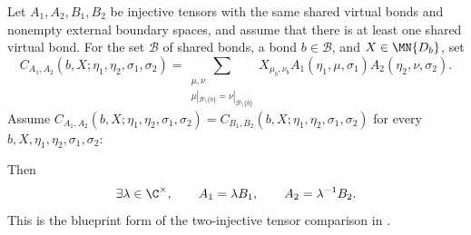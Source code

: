 \begin{theorem}%
    \label{thm:peps_twoInjectiveTensorInsertionComparison}
    \leanok
    Let $A_1,A_2,B_1,B_2$ be injective tensors with the same shared virtual
    bonds and nonempty external boundary spaces, and assume that there is at
    least one shared virtual bond. For the set $\mathcal B$ of shared bonds, a
    bond $b\in\mathcal B$, and $X\in\MN{D_b}$, set
    \[
        C_{A_1,A_2}(b,X;\eta_1,\eta_2,\sigma_1,\sigma_2)
        =
        \sum_{\substack{\mu,\nu\\
        \mu|_{\mathcal B\setminus\{b\}}
        =\nu|_{\mathcal B\setminus\{b\}}}}
        X_{\mu_b,\nu_b}
        A_1(\eta_1,\mu,\sigma_1)A_2(\eta_2,\nu,\sigma_2).
    \]
    Assume
    $C_{A_1,A_2}(b,X;\eta_1,\eta_2,\sigma_1,\sigma_2)
        =C_{B_1,B_2}(b,X;\eta_1,\eta_2,\sigma_1,\sigma_2)$ for every
    $b,X,\eta_1,\eta_2,\sigma_1,\sigma_2$:
    \begin{center}
        \TNPEPSTwoInjectiveTensorInsertionComparison
    \end{center}
    Then
    \[
        \exists \lambda\in\C^\times,\qquad
        A_1=\lambda B_1,\qquad
        A_2=\lambda^{-1}B_2.
    \]
    This is the blueprint form of the two-injective tensor comparison in
    \cite[Section~3]{Molnar2018NormalPEPS}.
\end{theorem}

